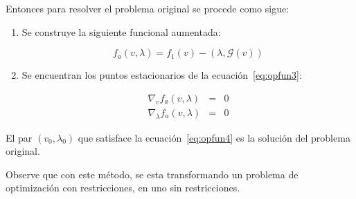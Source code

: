             Entonces para resolver el problema original se procede como sigue:

            \begin{enumerate}
                \item Se construye la siguiente funcional aumentada:

                \begin{equation}\label{eq:opfun3}
                    f_a(v, \lambda) = f_1(v) - \left( \lambda, \mathscr{G}(v) \right)
                \end{equation}

                \item Se encuentran los puntos estacionarios de la ecuación~\ref{eq:opfun3}:

                \begin{eqnarray}\label{eq:opfun4}
                    \nabla_v f_a(v, \lambda) & = & 0 \nonumber \\
                    \nabla_\lambda f_a(v, \lambda) & = & 0
                \end{eqnarray}
            \end{enumerate}

            El par $(v_0, \lambda_0)$ que satisface la ecuación~\ref{eq:opfun4} es la solución del problema original.

            Observe que con este método, se esta transformando un problema de optimización con restricciones, en uno sin restricciones.
